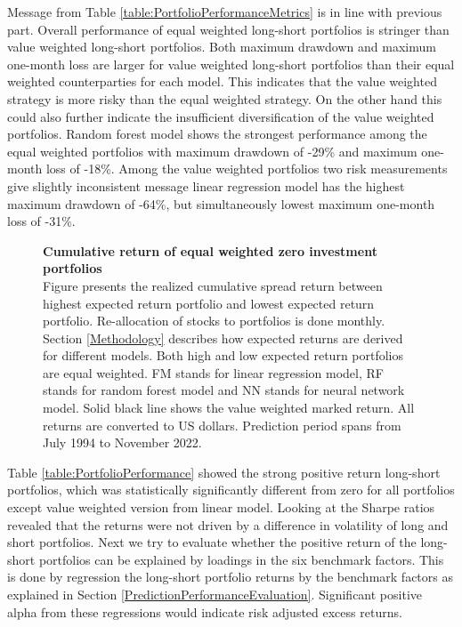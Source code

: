 \documentclass{article}
\begin{document}
Message from Table \ref{table:PortfolioPerformanceMetrics} is in line with previous part. Overall performance of equal weighted long-short portfolios is stringer than value weighted long-short portfolios. Both maximum drawdown and maximum one-month loss are larger for value weighted long-short portfolios than their equal weighted counterparties for each model. This indicates that the value weighted strategy is more risky than the equal weighted strategy. On the other hand this could also further indicate the insufficient diversification of the value weighted portfolios. Random forest model shows the strongest performance among the equal weighted portfolios with maximum drawdown of -29\% and maximum one-month loss of -18\%. Among the value weighted portfolios two risk measurements give slightly inconsistent message linear regression model has the highest maximum drawdown of -64\%, but simultaneously lowest maximum one-month loss of -31\%. \par

\begin{figure}[ht]
\centering
\caption[Cumulative return of equal weighted zero investment portfolios]{\textbf{Cumulative return of equal weighted zero investment portfolios}\\ Figure presents the realized cumulative spread return between highest expected return portfolio and lowest expected return portfolio. Re-allocation of stocks to portfolios is done monthly. Section \ref{Methodology} describes how expected returns are derived for different models. Both high and low expected return portfolios are equal weighted. FM stands for linear regression model, RF stands for random forest model and NN stands for neural network model. Solid black line shows the value weighted marked return. All returns are converted to US dollars. Prediction period spans from July 1994 to November 2022.}

\label{plot:cumul_ew_LS_portf_return}
\end{figure}

Table \ref{table:PortfolioPerformance} showed the strong positive return long-short portfolios, which was statistically significantly different from zero for all portfolios except value weighted version from linear model. Looking at the Sharpe ratios revealed that the returns were not driven by a difference in volatility of long and short portfolios. Next we try to evaluate whether the positive return of the long-short portfolios can be explained by loadings in the six benchmark factors. This is done by regression the long-short portfolio returns by the benchmark factors as explained in Section \ref{PredictionPerformanceEvaluation}. Significant positive alpha from these regressions would indicate risk adjusted excess returns. \par
\end{document}
